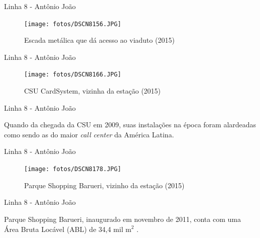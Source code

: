 \documentclass[spectratio=169, portuguese]{beamer}
\begin{document}

\begin{frame}{Linha 8 - Antônio João}
	
		\begin{figure}[h]
			\caption{Escada metálica que dá acesso ao viaduto (2015)}
			\texttt{[image: fotos/DSCN8156.JPG]}
		\end{figure}
	
\end{frame}


\begin{frame}{Linha 8 - Antônio João}
	
		\begin{figure}[h]
			\caption{CSU CardSystem, vizinha da estação (2015)}
			\texttt{[image: fotos/DSCN8166.JPG]}
		\end{figure}
	
\end{frame}


\begin{frame}{Linha 8 - Antônio João}
	
	Quando da chegada da CSU em 2009, suas instalações na época foram alardeadas como sendo as do maior \textit{call center} da América Latina\cite{investesp}.
	
\end{frame}


\begin{frame}{Linha 8 - Antônio João}
		
		\begin{figure}[h]
			\caption{Parque Shopping Barueri, vizinho da estação (2015)}
			\texttt{[image: fotos/DSCN8178.JPG]}
		\end{figure}
	
\end{frame}


\begin{frame}{Linha 8 - Antônio João}
	
	Parque Shopping Barueri, inaugurado em novembro de 2011, conta com uma Área Bruta Locável (ABL) de 34,4 mil m$^2$ \cite{valoreconomico}.
	
\end{frame}
\end{document}
